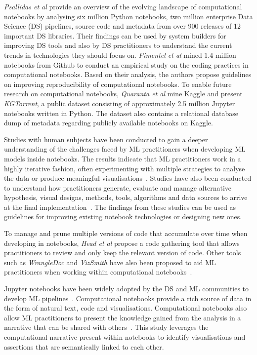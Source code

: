 \emph{Psallidas et al} provide an overview of the evolving landscape
of computational notebooks by analysing six million Python notebooks,
two million enterprise Data Science (DS) pipelines, source code and
metadata from over 900 releases of 12 important DS libraries. Their
findings can be used by system builders for improving DS tools and
also by DS practitioners to understand the current trends in
technologies they should focus on. \emph{Pimentel et al} mined 1.4
million notebooks from Github to conduct an empirical study on the
coding practices in computational notebooks. Based on their analysis,
the authors propose guidelines on improving reproducibility of
computational notebooks. To enable future research on computational
notebooks, \emph{Quaranta et al} mine Kaggle and present
\textit{KGTorrent}, a public dataset consisting of approximately 2.5
million Jupyter notebooks written in Python. The dataset also contains
a relational database dump of metadata regarding publicly available
notebooks on Kaggle.

Studies with human subjects have been conducted to gain a deeper
understanding of the challenges faced by ML practitioners when
developing ML models inside notebooks. The results indicate that ML
practitioners work in a highly iterative fashion, often experimenting
with multiple strategies to analyse the data or produce meaningful
visualisations~\cite{kandel2012enterprise, kery2018story,
  liu2019understanding, chattopadhyay2020wrong}. Studies have also
been conducted to understand how practitioners generate, evaluate and
manage alternative hypothesis, visual designs, methods, tools,
algorithms and data sources to arrive at the final
implementation~\cite{liu2019understanding,kandel2012enterprise}. The
findings from these studies can be used as guidelines for improving
existing notebook technologies or designing new ones.

To manage and prune multiple versions of code that accumulate over
time when developing in notebooks, \emph{Head et al} propose a code
gathering tool that allows practitioners to review and only keep the
relevant version of code. Other tools such as \textit{WrangleDoc} and
\textit{VizSmith} have also been proposed to aid ML practitioners when
working within computational notebooks~\cite{yang2021subtle,
  bavishi2021vizsmith}.

Jupyter notebooks have been widely adopted by the DS and ML
communities to develop ML
pipelines~\cite{wang2020assessing,pimentel2019large,quaranta2021kgtorrent}.
Computational notebooks provide a rich source of data in the form of
natural text, code and visualisations. Computational notebooks also
allow ML practitioners to present the knowledge gained from the
analysis in a narrative that can be shared with
others~\cite{rule2018exploration}. This study leverages the
computational narrative present within notebooks to identify
visualisations and assertions that are semantically linked to each
other.

